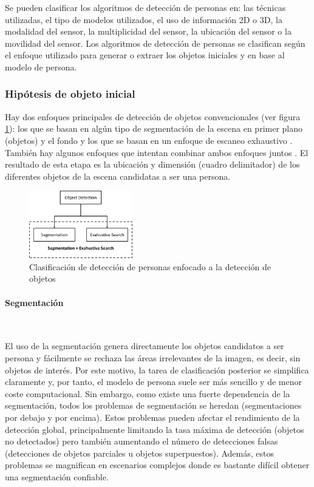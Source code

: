 Se pueden clasificar los algoritmos de detección de personas en: las técnicas utilizadas, el tipo de modelos utilizados, el uso de información 2D o 3D, la modalidad del sensor, la multiplicidad del sensor, la ubicación del sensor o la movilidad del sensor. Los algoritmos de detección de personas se clasifican según el enfoque utilizado para generar o extraer los objetos iniciales y en base al modelo de persona.

\subsubsection*{Hipótesis de objeto inicial}
\label{subsubsec:hipotesis-inicial-deteccion-personas-objetos}

Hay dos enfoques principales de detección de objetos convencionales (ver figura \ref{fig:people-detection-classification}): los que se basan en algún tipo de segmentación de la escena en primer plano (objetos) y el fondo \cite{868681} y los que se basan en un enfoque de escaneo exhaustivo \cite{4408936}. También hay algunos enfoques que intentan combinar ambos enfoques juntos \cite{4220664}. El resultado de esta etapa es la ubicación y dimensión (cuadro delimitador) de los diferentes objetos de la escena candidatas a ser una persona.

\begin{figure}[ht]
\centering
\includegraphics[width=0.4\textwidth]{img/chapters/estado-del-arte/people-detection-classification.png}
\caption{\label{fig:people-detection-classification}Clasificación de detección de personas enfocado a la detección de objetos}
\end{figure}

\paragraph*{Segmentación}\mbox{} \\
\label{parag:deteccion-objetos-personas-segmentacion}

El uso de la segmentación genera directamente los objetos candidatos a ser persona y fácilmente se rechaza las áreas irrelevantes de la imagen, es decir, sin objetos de interés. Por este motivo, la tarea de clasificación posterior se simplifica claramente y, por tanto, el modelo de persona suele ser más sencillo y de menor coste computacional. Sin embargo, como existe una fuerte dependencia de la segmentación, todos los problemas de segmentación se heredan (segmentaciones por debajo y por encima). Estos problemas pueden afectar el rendimiento de la detección global, principalmente limitando la tasa máxima de detección (objetos no detectados) pero también aumentando el número de detecciones falsas (detecciones de objetos parciales u objetos superpuestos). Además, estos problemas se magnifican en escenarios complejos donde es bastante difícil obtener una segmentación confiable.

